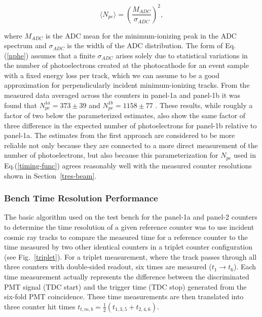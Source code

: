 \documentclass{elsart}
\begin{document}
\begin{equation}
\label{nphe}
\langle N_{pe} \rangle = \left( \frac{M_{ADC}}{\sigma_{ADC}} \right)^2,
\end{equation}

\noindent
where $M_{ADC}$ is the ADC mean for the minimum-ionizing peak in the ADC spectrum and $\sigma_{ADC}$
is the width of the ADC distribution. The form of Eq.(\ref{nphe}) assumes that a finite $\sigma_{ADC}$
arises solely due to statistical variations in the number of photoelectrons created at the photocathode for
an event sample with a fixed energy loss per track, which we can assume to be a good approximation for
perpendicularly incident minimum-ionizing tracks. From the measured data averaged across the counters in
panel-1a and panel-1b it was found that $N_{pe}^{1a} = 373 \pm 39$ and $N_{pe}^{1b} = 1158 \pm 77$
\cite{pmt-currents}. These results, while roughly a factor of two below the parameterized estimates, also
show the same factor of three difference in the expected number of photoelectrons for panel-1b relative
to panel-1a. The estimates from the first approach are considered to be more reliable not only because they
are connected to a more direct measurement of the number of photoelectrons, but also because this
parameterization for $N_{pe}$ used in Eq.(\ref{timing-func}) agrees reasonably well with the measured
counter resolutions shown in Section~\ref{tres-beam}.

\subsubsection{Bench Time Resolution Performance}
\label{sec-bench}

The basic algorithm used on the test bench for the panel-1a and panel-2 counters to determine the time
resolution of a given reference counter was to use incident cosmic ray tracks to compare the measured
time for a reference counter to the time measured by two other identical counters in a triplet counter
configuration (see Fig.~\ref{triplet}). For a triplet measurement, where the track passes through all
three counters with double-sided readout, six times are measured ($t_1 \to t_6$). Each time measurement
actually represents the difference between the discriminated PMT signal (TDC start) and the trigger
time (TDC stop) generated from the six-fold PMT coincidence. These time measurements are then
translated into three counter hit times $t_{t,m,b} = \frac{1}{2}(t_{1,3,5} + t_{2,4,6})$.
\end{document}
